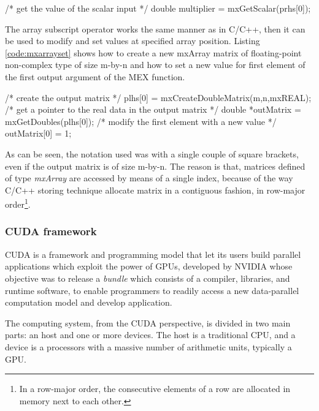 \documentclass[12pt,a4paper]{extarticle}
\begin{document}
\begin{cpp}[caption={Accessing the first non-imaginary element of the mxArray pointer passed as argument from the MEX function input arguments},label=code:mxarraygetscalar]
/* get the value of the scalar input  */
double multiplier = mxGetScalar(prhs[0]);
\end{cpp}

The array subscript operator works the same manner as in C/C++, then it can be used to modify and set values at specified array position. Listing \ref{code:mxarrayset} shows how to create a new mxArray matrix of floating-point non-complex type of size m-by-n and how to set a new value for first element of the first output argument of the MEX function.

\begin{cpp}[caption={Create the output matrix corresponding to the first output array. Get the pointer to the real data and set a new value for the first element},label=code:mxarrayset]
/* create the output matrix */
plhs[0] = mxCreateDoubleMatrix(m,n,mxREAL);
/* get a pointer to the real data in the output matrix */
double *outMatrix = mxGetDoubles(plhs[0]);
/* modify the first element with a new value */
outMatrix[0] = 1;
\end{cpp}

As can be seen, the notation used was with a single couple of square brackets, even if the output matrix is of size m-by-n. The reason is that, matrices defined of type \textit{mxArray} are accessed by means of a single index, because of the way C/C++ storing technique allocate matrix in a contiguous fashion, in row-major order\footnote{In a row-major order, the consecutive elements of a row are allocated in memory next to each other. %
}.


\subsubsection{CUDA framework}
CUDA is a framework and programming model that let its users build parallel applications which exploit the power of GPUs, developed by NVIDIA whose objective was to release a \textit{bundle} which consists of a compiler, libraries, and runtime software, to enable programmers to readily access a new data-parallel computation model and develop application.\cite{KirkHwu_2014:3}

The computing system, from the CUDA perspective, is divided in two main parts: an host and one or more devices. The host is a traditional CPU, and a device is a processors with a massive number of arithmetic units, typically a GPU.
\end{document}
